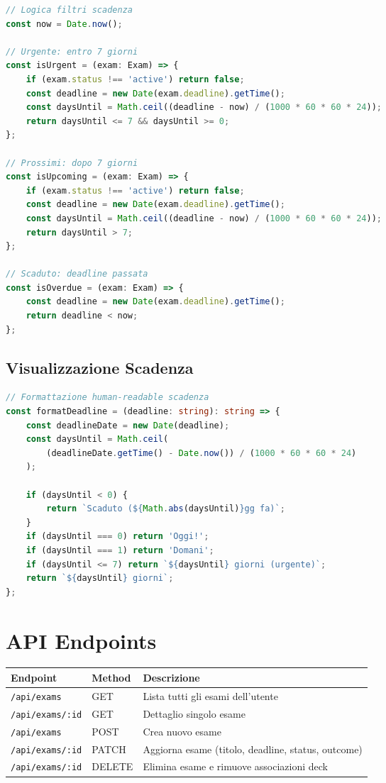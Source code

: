 \documentclass[11pt,a4paper]{article}
\begin{document}
\begin{lstlisting}[language=TypeScript]
// Logica filtri scadenza
const now = Date.now();

// Urgente: entro 7 giorni
const isUrgent = (exam: Exam) => {
    if (exam.status !== 'active') return false;
    const deadline = new Date(exam.deadline).getTime();
    const daysUntil = Math.ceil((deadline - now) / (1000 * 60 * 60 * 24));
    return daysUntil <= 7 && daysUntil >= 0;
};

// Prossimi: dopo 7 giorni
const isUpcoming = (exam: Exam) => {
    if (exam.status !== 'active') return false;
    const deadline = new Date(exam.deadline).getTime();
    const daysUntil = Math.ceil((deadline - now) / (1000 * 60 * 60 * 24));
    return daysUntil > 7;
};

// Scaduto: deadline passata
const isOverdue = (exam: Exam) => {
    const deadline = new Date(exam.deadline).getTime();
    return deadline < now;
};
\end{lstlisting}

\subsection{Visualizzazione Scadenza}

\begin{lstlisting}[language=TypeScript]
// Formattazione human-readable scadenza
const formatDeadline = (deadline: string): string => {
    const deadlineDate = new Date(deadline);
    const daysUntil = Math.ceil(
        (deadlineDate.getTime() - Date.now()) / (1000 * 60 * 60 * 24)
    );
    
    if (daysUntil < 0) {
        return `Scaduto (${Math.abs(daysUntil)}gg fa)`;
    }
    if (daysUntil === 0) return 'Oggi!';
    if (daysUntil === 1) return 'Domani';
    if (daysUntil <= 7) return `${daysUntil} giorni (urgente)`;
    return `${daysUntil} giorni`;
};
\end{lstlisting}

\section{API Endpoints}\label{sec:endpoints}

\begin{longtable}{|p{4cm}|p{1.5cm}|p{8cm}|}
\hline
\textbf{Endpoint} & \textbf{Method} & \textbf{Descrizione} \\
\hline
\endfirsthead
\texttt{/api/exams} & GET & Lista tutti gli esami dell'utente \\
\hline
\texttt{/api/exams/:id} & GET & Dettaglio singolo esame \\
\hline
\texttt{/api/exams} & POST & Crea nuovo esame \\
\hline
\texttt{/api/exams/:id} & PATCH & Aggiorna esame (titolo, deadline, status, outcome) \\
\hline
\texttt{/api/exams/:id} & DELETE & Elimina esame e rimuove associazioni deck \\
\hline
\end{longtable}
\end{document}
